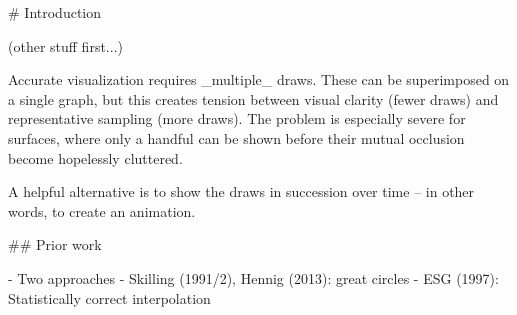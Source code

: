 # Introduction

(other stuff first...)

Accurate visualization requires _multiple_ draws.
These can be superimposed on a single graph, but this creates tension between
visual clarity (fewer draws) and representative sampling (more draws).
The problem is especially severe for surfaces, where only a handful can be
shown before their mutual occlusion become hopelessly cluttered.

A helpful alternative is to show the draws in succession over time -- in other
words, to create an animation.

## Prior work

- Two approaches
  - Skilling (1991/2), Hennig (2013): great circles
  - ESG (1997): Statistically correct interpolation
